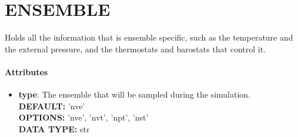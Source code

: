 \section{ENSEMBLE}
\label{ENSEMBLE}
Holds all the information that is ensemble specific, such as the temperature and the external pressure, and the thermostats and barostats that control it.
\paragraph{Attributes}
 \begin{itemize}
\item {\bf type}:
 The ensemble that will be sampled during the simulation.
{\\ \bf DEFAULT: }'nve'
{\\ \bf OPTIONS: }'nve', 'nvt', 'npt', 'nst'
{\\ \bf DATA TYPE: }str
\end{itemize}
 
